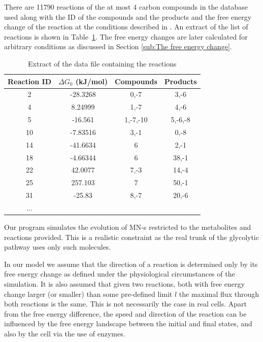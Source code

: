 \documentclass[a4paper,12pt]{article}
\begin{document}
	There are 11790 reactions of the at most 4 carbon compounds in the database used along with the ID of the compounds and the products and the free energy change of the reaction at the conditions described in \cite{BartekLower}. An extract of the list of reactions is shown in Table~\ref{tab:reacs}. The free energy changes are later calculated for arbitrary conditions as discussed in Section \ref{sub:The free energy change}.

	\begin{table}[htpb]
		\centering
		\begin{tabular}{cccc}
		Reaction ID &	$\Delta G_0$ (kJ/mol) & Compounds & Products \\ \hline
		2 &	-28.3268      & 0,-7   & 3,-6   \\
		4 &	8.24999      & 1,-7   & 4,-6   \\
		5 &	-16.561      & 1,-7,-10 & 5,-6,-8 \\
		10 &	-7.83516      & 3,-1   & 0,-8   \\
		14 &	-41.6634      & 6     & 2,-1   \\
		18 &	-4.66344      & 6     & 38,-1  \\
		22 &	42.0077      & 7,-3   & 14,-4  \\
		25 &	257.103      & 7     & 50,-1  \\
		31 &	-25.83       & 8,-7   & 20,-6  \\
		...&      &     
		\end{tabular}
		\caption{Extract of the data file containing the reactions}
		\label{tab:reacs}
	\end{table}
	
	Our program simulates the evolution of MN-s restricted to the metabolites and reactions provided. This is a realistic constraint as the real trunk of the glycolytic pathway uses only such molecules.

	In our model we assume that the direction of a reaction is determined only by its free energy change as defined under the physiological circumstances of the simulation. It is also assumed that given two reactions, both with free energy change larger (or smaller) than some pre-defined limit $l$ the maximal flux through both reactions is the same. This is not necessarily the case in real cells. Apart from the free energy difference, the speed and direction of the reaction can be influenced by the free energy landscape between the initial and final states, and also by the cell via the use of enzymes. 
\end{document}

